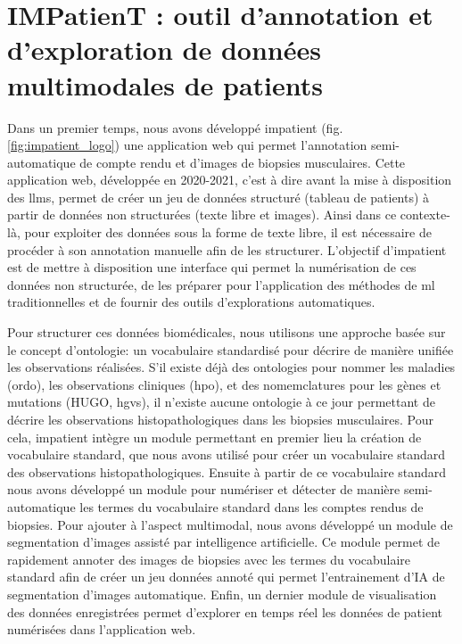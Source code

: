\chapter{IMPatienT : outil d’annotation et d’exploration de données multimodales de patients}\label{chap_imp}

Dans un premier temps, nous avons développé \gls{impatient} (fig. \ref{fig:impatient_logo}) une application web qui permet l'annotation semi-automatique de compte rendu et d'images de biopsies musculaires. Cette application web, développée en 2020-2021, c'est à dire avant la mise à disposition des \gls{llms}, permet de créer un jeu de données structuré (tableau de patients) à partir de données non structurées (texte libre et images). Ainsi dans ce contexte-là, pour exploiter des données sous la forme de texte libre, il est nécessaire de procéder à son annotation manuelle afin de les structurer. L'objectif d'\gls{impatient} est de mettre à disposition une interface qui permet la numérisation de ces données non structurée, de les préparer pour l'application des méthodes de \gls{ml} traditionnelles et de fournir des outils d'explorations automatiques.


Pour structurer ces données biomédicales, nous utilisons une approche basée sur le concept d'ontologie: un vocabulaire standardisé pour décrire de manière unifiée les observations réalisées. S'il existe déjà des ontologies pour nommer les maladies (\gls{ordo}), les observations cliniques (\gls{hpo}), et des nomemclatures pour les gènes et mutations (HUGO, \gls{hgvs}), il n'existe aucune ontologie à ce jour permettant de décrire les observations histopathologiques dans les biopsies musculaires. Pour cela, \gls{impatient} intègre un module permettant en premier lieu la création de vocabulaire standard, que nous avons utilisé pour créer un vocabulaire standard des observations histopathologiques. Ensuite à partir de ce vocabulaire standard nous avons développé un module pour numériser et détecter de manière semi-automatique les termes du vocabulaire standard dans les comptes rendus de biopsies. Pour ajouter à l'aspect multimodal, nous avons développé un module de segmentation d'images assisté par intelligence artificielle. Ce module permet de rapidement annoter des images de biopsies avec les  termes du vocabulaire standard afin de créer un jeu données annoté qui permet l'entrainement d'IA de segmentation d'images automatique. Enfin, un dernier module de visualisation des données enregistrées permet d'explorer en temps réel les données de patient numérisées dans l'application web.

